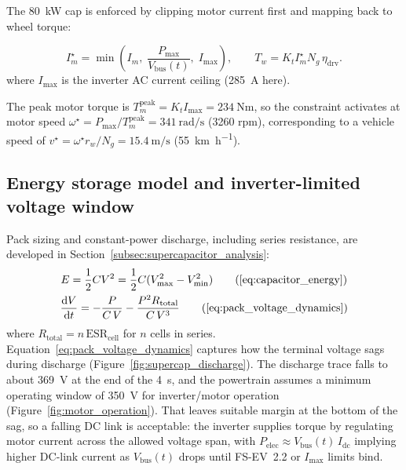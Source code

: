 \documentclass[11pt, a4paper]{report}
\numberwithin{equation}{section}
\begin{document}
\begin{refsection}
The \SI{80}{\kilo\watt} cap is enforced by clipping motor current
first and mapping back to wheel torque:

\begin{equation}
I_m^\star = \min\!\left(I_m,\; \frac{P_\text{max}}{V_{\mathrm{bus}}(t)},\; I_\text{max}\right),
\qquad
T_w = K_t I_m^\star N_g \, \eta_\text{drv}.
\label{eq:power_limit}
\end{equation}
where $I_\text{max}$ is the inverter AC current ceiling (\SI{285}{\ampere} here).

The peak motor torque is $T_m^\text{peak} = K_t I_\text{max} =
\SI{234}{\newton\metre}$, so the constraint activates at motor speed
$\omega^\star = P_\text{max}/T_m^\text{peak} = \SI{341}{\radian\per\second}$
(\num{3260} rpm), corresponding to a vehicle speed of
$v^\star = \omega^\star r_w / N_g = \SI{15.4}{\metre\per\second}$
(\SI{55}{\kilo\metre\per\hour}).

\subsection{Energy storage model and inverter-limited voltage window}
\label{sec:accum_storage_model}

Pack sizing and constant-power discharge, including series resistance, are developed in Section~\ref{subsec:supercapacitor_analysis}:
\begin{gather}
E=\frac{1}{2}CV^2=\frac{1}{2}C(V_{\max}^2-V_{\min}^2)
\tag{\ref{eq:capacitor_energy}}\\
\frac{\mathrm{d}V}{\mathrm{d}t}
=-\frac{P}{C\,V}-\frac{P^2 R_{\mathrm{total}}}{C\,V^{3}}
\tag{\ref{eq:pack_voltage_dynamics}}
\end{gather}
where $R_{\mathrm{total}}=n\,\mathrm{ESR}_{\mathrm{cell}}$ for $n$ cells in series.
Equation~\eqref{eq:pack_voltage_dynamics} captures how the terminal voltage sags during discharge (Figure~\ref{fig:supercap_discharge}).
The discharge trace falls to about \SI{369}{\volt} at the end of the \SI{4}{\second}, and the powertrain assumes a minimum operating window of \SI{350}{\volt} for inverter/motor operation (Figure~\ref{fig:motor_operation}).
That leaves suitable margin at the bottom of the sag, so a falling DC link is acceptable: the inverter supplies torque by regulating motor current across the allowed voltage span, with $P_{\mathrm{elec}}\approx V_{\mathrm{bus}}(t)\,I_{\mathrm{dc}}$ implying higher DC-link current as $V_{\mathrm{bus}}(t)$ drops until FS-EV~2.2 or $I_\text{max}$ limits bind.


\end{refsection}
\end{document}
